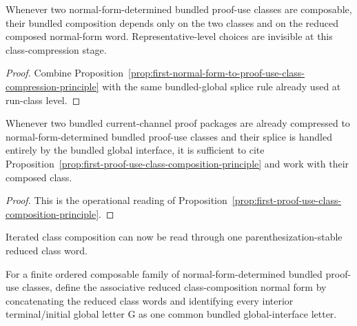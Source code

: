 \begin{proposition}
\label{prop:first-proof-use-class-composition-principle}
Whenever two normal-form-determined bundled proof-use classes are composable, their bundled composition depends only on the two classes and on the reduced composed normal-form word. Representative-level choices are invisible at this class-compression stage.
\end{proposition}

\begin{proof}
Combine Proposition~\ref{prop:first-normal-form-to-proof-use-class-compression-principle} with the same bundled-global splice rule already used at run-class level.
\end{proof}

\begin{corollary}
\label{cor:use-rule-for-the-first-proof-use-class-composition-principle}
Whenever two bundled current-channel proof packages are already compressed to normal-form-determined bundled proof-use classes and their splice is handled entirely by the bundled global interface, it is sufficient to cite Proposition~\ref{prop:first-proof-use-class-composition-principle} and work with their composed class.
\end{corollary}

\begin{proof}
This is the operational reading of Proposition~\ref{prop:first-proof-use-class-composition-principle}.
\end{proof}

\begin{remark}
\label{rem:status-of-the-first-associative-proof-use-class-normal-form-step}
Iterated class composition can now be read through one parenthesization-stable reduced class word.
\end{remark}

\begin{definition}
\label{def:associative-reduced-class-composition-normal-form}
For a finite ordered composable family of normal-form-determined bundled proof-use classes, define the associative reduced class-composition normal form by concatenating the reduced class words and identifying every interior terminal/initial global letter $\mathrm G$ as one common bundled global-interface letter.
\end{definition}

